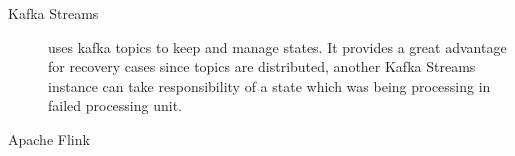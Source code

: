\begin{description}
    \item[Kafka Streams] uses kafka topics to keep and manage states.
    It provides a great advantage for recovery cases since topics
    are distributed, another Kafka Streams instance can take responsibility
    of a state which was being processing in failed processing unit.
    \item[Apache Flink]
\end{description}